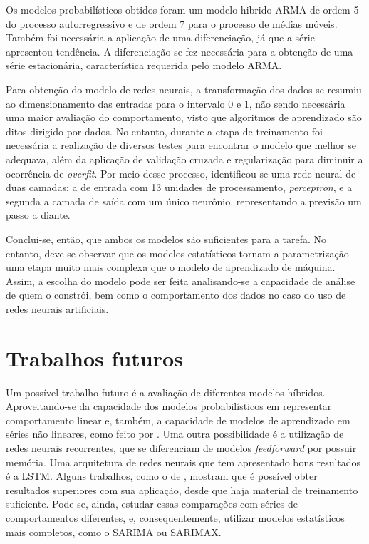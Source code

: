 \documentclass[
    12pt,
    oneside,
    a4paper,
    english,
    brazil
]{abntex2}
\begin{document}
Os modelos probabilísticos  obtidos foram um modelo hibrido ARMA  de ordem 5 do
processo autorregressivo e de ordem 7  para o processo de médias móveis. Também
foi necessária  a aplicação  de uma  diferenciação, já  que a  série apresentou
tendência.  A diferenciação  se fez  necessária para  a obtenção  de uma  série
estacionária, característica requerida pelo modelo ARMA\@.

Para obtenção do modelo de redes  neurais, a transformação dos dados se resumiu
ao dimensionamento  das entradas para o  intervalo 0 e 1,  não sendo necessária
uma maior avaliação  do comportamento, visto que algoritmos  de aprendizado são
ditos  dirigido por  dados.  No entanto,  durante a  etapa  de treinamento  foi
necessária  a  realização  de  diversos  testes para  encontrar  o  modelo  que
melhor  se adequava,  além da  aplicação de  validação cruzada  e regularização
para  diminuir  a ocorrência  de  \textit{overfit}.  Por meio  desse  processo,
identificou-se uma rede neural de duas camadas: a de entrada com 13 unidades de
processamento, \textit{perceptron}, e a segunda a  camada de saída com um único
neurônio, representando a previsão um passo a diante.

Conclui-se,  então, que  ambos os  modelos são  suficientes para  a tarefa.  No
entanto, deve-se observar  que os modelos estatísticos  tornam a parametrização
uma etapa muito mais complexa que o  modelo de aprendizado de máquina. Assim, a
escolha do modelo pode ser feita  analisando-se a capacidade de análise de quem
o constrói, bem como o comportamento dos  dados no caso do uso de redes neurais
artificiais.

\section{Trabalhos futuros}

Um  possível trabalho  futuro é  a  avaliação de  diferentes modelos  híbridos.
Aproveitando-se  da  capacidade  dos  modelos  probabilísticos  em  representar
comportamento  linear  e,  também,  a  capacidade  de  modelos  de  aprendizado
em  séries  não lineares,  como  feito  por .  Uma  outra
possibilidade é a  utilização de redes neurais recorrentes,  que se diferenciam
de modelos \textit{feedforward}  por possuir memória. Uma  arquitetura de redes
neurais que tem apresentado bons resultados  é a LSTM\@. Alguns trabalhos, como
o de , mostram que é possível obter resultados superiores
com sua aplicação, desde que  haja material de treinamento suficiente. Pode-se,
ainda, estudar  essas comparações com  séries de comportamentos  diferentes, e,
consequentemente, utilizar  modelos estatísticos mais completos,  como o SARIMA
ou SARIMAX\@.

\postextual


\end{document}
